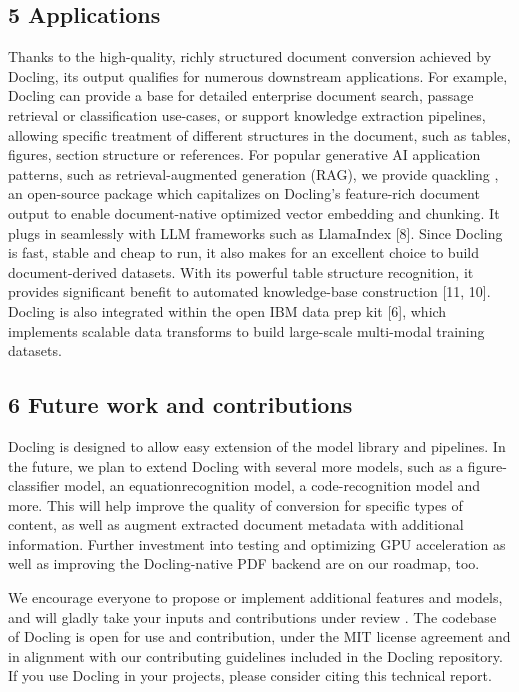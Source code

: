 \subsection{5 Applications}

Thanks to the high-quality, richly structured document conversion achieved by Docling, its output qualifies for numerous downstream applications. For example, Docling can provide a base for detailed enterprise document search, passage retrieval or classification use-cases, or support knowledge extraction pipelines, allowing specific treatment of different structures in the document, such as tables, figures, section structure or references. For popular generative AI application patterns, such as retrieval-augmented generation (RAG), we provide quackling , an open-source package which capitalizes on Docling's feature-rich document output to enable document-native optimized vector embedding and chunking. It plugs in seamlessly with LLM frameworks such as LlamaIndex [8]. Since Docling is fast, stable and cheap to run, it also makes for an excellent choice to build document-derived datasets. With its powerful table structure recognition, it provides significant benefit to automated knowledge-base construction [11, 10]. Docling is also integrated within the open IBM data prep kit [6], which implements scalable data transforms to build large-scale multi-modal training datasets.

\subsection{6 Future work and contributions}

Docling is designed to allow easy extension of the model library and pipelines. In the future, we plan to extend Docling with several more models, such as a figure-classifier model, an equationrecognition model, a code-recognition model and more. This will help improve the quality of conversion for specific types of content, as well as augment extracted document metadata with additional information. Further investment into testing and optimizing GPU acceleration as well as improving the Docling-native PDF backend are on our roadmap, too.

We encourage everyone to propose or implement additional features and models, and will gladly take your inputs and contributions under review . The codebase of Docling is open for use and contribution, under the MIT license agreement and in alignment with our contributing guidelines included in the Docling repository. If you use Docling in your projects, please consider citing this technical report.

